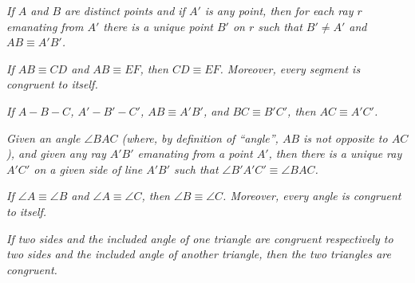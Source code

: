 \documentclass[11pt,a4paper]{article}
\theoremstyle{definition}
\theoremstyle{remark}
\numberwithin{equation}{section}
\begin{document}
\begin{enumerate}[label=\textrm{[}\textbf{C}\arabic*\textrm{]}]
  \item\label{C1} \emph{If $A$ and $B$ are distinct points and if $A'$ is any point, then for each ray $r$ emanating from $A'$ there is a unique point $B'$ on $r$ such that $B'\neq A'$ and $AB\equiv A'B'$.}

  \item\label{C2} \emph{If $AB\equiv CD$ and $AB\equiv EF$, then $CD\equiv EF$. Moreover, every segment is congruent to itself.}

  \item\label{C3} \emph{If $A-B-C$, $A'-B'-C'$, $AB\equiv A'B'$, and $BC\equiv B'C'$, then $AC\equiv A'C'$.}

  \item\label{C4} \emph{Given an angle $\angle BAC$ (where, by definition of ``angle'', $AB$ is not opposite to $AC$), and given any ray $A'B'$ emanating from a point $A'$, then there is a unique ray $A'C'$ on a given side of line $A'B'$ such that
  $\angle B'A'C'\equiv\angle BAC$.}

  \item\label{C5} \emph{If $\angle A\equiv\angle B$ and $\angle A\equiv\angle C$, then $\angle B\equiv\angle C$. Moreover, every angle is congruent to itself.}

  \item\label{C6} \emph{If two sides and the included angle of one triangle are congruent respectively to two sides and the included angle of another triangle, then the two triangles are congruent.}
\end{enumerate}
\end{document}
